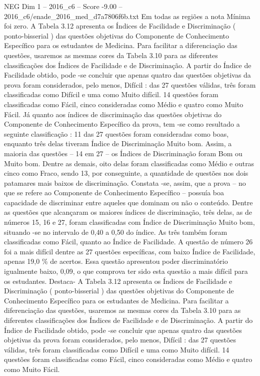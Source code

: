 \begin{textsample}{NEG Dim 1 – 2016\_c6 – Score -9.00 – 2016\_c6/enade\_2016\_med\_d7a7806f6b.txt}
Em todas as regiões a nota Mínima foi zero.
A Tabela 3.12 apresenta os Índices de Facilidade e Discriminação ( ponto-bisserial ) das questões objetivas do Componente de Conhecimento Específico para os estudantes de Medicina.
Para facilitar a diferenciação das questões, usaremos as mesmas cores da Tabela 3.10 para as diferentes classificações dos Índices de Facilidade e de Discriminação.
A partir do Índice de Facilidade obtido, pode -se concluir que apenas quatro das questões objetivas da prova foram considerados, pelo menos, Difícil : das 27 questões válidas, três foram classificadas como Difícil e uma como Muito difícil. 14 questões foram classificadas como Fácil, cinco consideradas como Médio e quatro como Muito Fácil.
Já quanto aos índices de discriminação das questões objetivas do Componente de Conhecimento Específico da prova, tem -se como resultado a seguinte classificação : 11 das 27 questões foram consideradas como boas, enquanto três delas tiveram Índice de Discriminação Muito bom.
Assim, a maioria das questões – 14 em 27 – os Índices de Discriminação foram Bom ou Muito bom.
Dentre as demais, oito delas foram classificadas como Médio e outras cinco como Fraco, sendo 13, por conseguinte, a quantidade de questões nos dois patamares mais baixos de discriminação.
Constata -se, assim, que a prova – no que se refere ao Componente de Conhecimento Específico – possuía boa capacidade de discriminar entre aqueles que dominam ou não o conteúdo.
Dentre as questões que alcançaram os maiores índices de discriminação, três delas, as de números 15, 16 e 27, foram classificadas com Índice de Discriminação Muito bom, situando -se no intervalo de 0,40 a 0,50 do índice.
As três também foram classificadas como Fácil, quanto ao Índice de Facilidade.
A questão de número 26 foi a mais difícil dentre as 27 questões específicas, com baixo Índice de Facilidade, apenas 19,0 \% de acertos.
Essa questão apresentou poder discriminatório igualmente baixo, 0,09, o que comprova ter sido esta questão a mais difícil para os estudantes.
Destaca- A Tabela 3.12 apresenta os Índices de Facilidade e Discriminação ( ponto-bisserial ) das questões objetivas do Componente de Conhecimento Específico para os estudantes de Medicina.
Para facilitar a diferenciação das questões, usaremos as mesmas cores da Tabela 3.10 para as diferentes classificações dos Índices de Facilidade e de Discriminação.
A partir do Índice de Facilidade obtido, pode -se concluir que apenas quatro das questões objetivas da prova foram considerados, pelo menos, Difícil : das 27 questões válidas, três foram classificadas como Difícil e uma como Muito difícil. 14 questões foram classificadas como Fácil, cinco consideradas como Médio e quatro como Muito Fácil.

\end{textsample}
